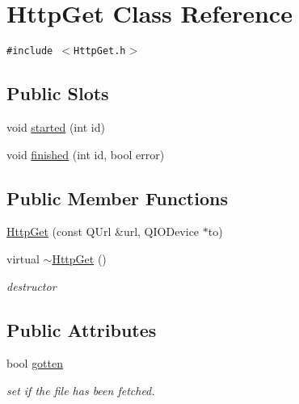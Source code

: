 \hypertarget{classHttpGet}{
\section{HttpGet Class Reference}
\label{classHttpGet}
}
{\tt \#include $<$HttpGet.h$>$}

\subsection*{Public Slots}
\begin{CompactItemize}
\item 
void \hyperlink{classHttpGet_35c20afd19d381fb0a3b56a2a872d3dc}{started} (int id)
\item 
void \hyperlink{classHttpGet_0159973f3e836f436ebf02984eb622f7}{finished} (int id, bool error)
\end{CompactItemize}
\subsection*{Public Member Functions}
\begin{CompactItemize}
\item 
\hyperlink{classHttpGet_76edd93335851c30cb2e2970ac2b1ee3}{HttpGet} (const QUrl \&url, QIODevice $\ast$to)
\item 
\hypertarget{classHttpGet_6de362cb31e4710b9e5aaedf7baa44aa}{
virtual \hyperlink{classHttpGet_6de362cb31e4710b9e5aaedf7baa44aa}{$\sim$HttpGet} ()}
\label{classHttpGet_6de362cb31e4710b9e5aaedf7baa44aa}

\begin{CompactList}\small\item\em destructor \item\end{CompactList}\end{CompactItemize}
\subsection*{Public Attributes}
\begin{CompactItemize}
\item 
bool \hyperlink{classHttpGet_f807ab4073ff2e604bb3aea0cc2e121d}{gotten}
\begin{CompactList}\small\item\em set if the file has been fetched. \item\end{CompactList}\end{CompactItemize}
